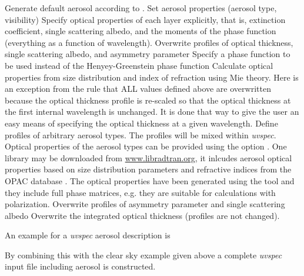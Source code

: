 \begin{description}
  Generate default aerosol according to \citet{shettle89}.
  Set \cite{shettle89} aerosol properties (aerosol
  type, visibility)
  Specify optical properties of each
  layer explicitly, that is, extinction coefficient, single scattering
  albedo, and the moments of the phase function (everything as a
  function of wavelength).
  Overwrite profiles of optical thickness, single
  scattering albedo, and asymmetry parameter
  Specify a phase function to be
  used instead of the Henyey-Greenstein phase function
  Calculate optical properties from size
  distribution and index of refraction using Mie theory. Here is an
  exception from the rule that ALL values defined above are overwritten
  because the optical thickness profile is re-scaled so that the optical
  thickness at the first internal wavelength is unchanged. It is done
  that way to give the user an easy means of specifying the optical
  thickness at a given wavelength.
   Define profiles of arbitrary aerosol
  types. The profiles will be mixed within {\sl uvspec}. Optical properties
  of the aerosol types can be provided using the option
  . One library may be downloaded from
  \url{www.libradtran.org}, it inlcudes aerosol optical properties
  based on size distribution parameters and refractive indices from
  the OPAC database \citep{hess98:_optic_proper_aeros_cloud}. The optical properties
  have been generated using the  tool and they include full
  phase matrices, e.g. they are suitable for calculations with
  polarization.  
  Overwrite
  profiles of asymmetry parameter and single scattering albedo
  Overwrite the integrated optical
  thickness (profiles are not changed).
\end{description}

An example for a {\sl uvspec} aerosol description is


\noindent By combining this with the clear sky example given above a
complete {\sl uvspec} input file including aerosol is constructed.


